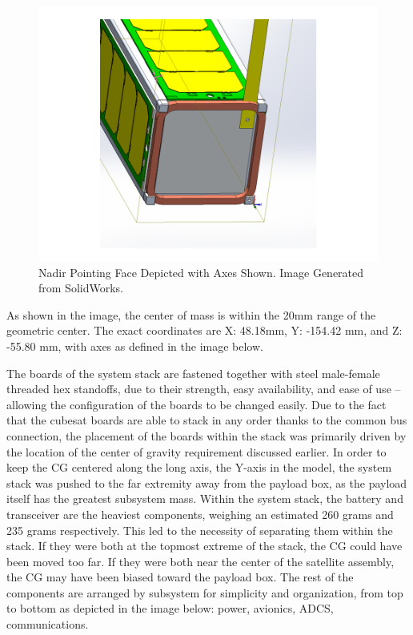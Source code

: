 \documentclass[12pt]{article}
\begin{document}
\begin{figure}[!ht]
\centering
\includegraphics[width=5in]{images/STR-7(2).png}
\caption{Nadir Pointing Face Depicted with Axes Shown. Image Generated from SolidWorks.}
\label{fig:str-7}
\end{figure}


As shown in the image, the center of mass is within the 20mm range of the geometric center. The exact coordinates are X: 48.18mm, Y: -154.42 mm, and Z: -55.80 mm, with axes as defined in the image below.

The boards of the system stack are fastened together with steel male-female threaded hex standoffs, due to their strength, easy availability, and ease of use – allowing the configuration of the boards to be changed easily. Due to the fact that the cubesat boards are able to stack in any order thanks to the common bus connection, the placement of the boards within the stack was primarily driven by the location of the center of gravity requirement discussed earlier. In order to keep the CG centered along the long axis, the Y-axis in the model, the system stack was pushed to the far extremity away from the payload box, as the payload itself has the greatest subsystem mass. Within the system stack, the battery and transceiver are the heaviest components, weighing an estimated 260 grams and 235 grams respectively. This led to the necessity of separating them within the stack. If they were both at the topmost extreme of the stack, the CG could have been moved too far. If they were both near the center of the satellite assembly, the CG may have been biased toward the payload box.  The rest of the components are arranged by subsystem for simplicity and organization, from top to bottom as depicted in the image below: power, avionics, ADCS, communications.
\end{document}
